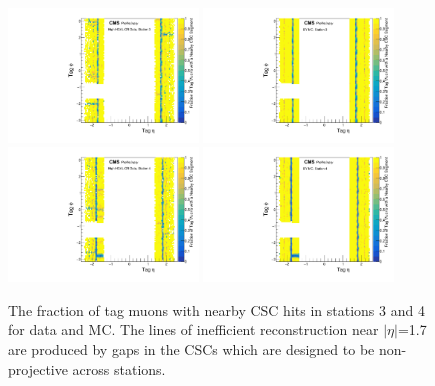 \begin{figure}[htbp]
    \includegraphics[width=0.45\textwidth]{figures/cscNearbyFracData_station2.pdf}
    \hspace{0.01\textwidth}
    \centering
    \includegraphics[width=0.45\textwidth]{figures/cscNearbyFracMC_station2.pdf}
    \includegraphics[width=0.45\textwidth]{figures/cscNearbyFracData_station3.pdf}
    \hspace{0.01\textwidth}
    \includegraphics[width=0.45\textwidth]{figures/cscNearbyFracMC_station3.pdf}
    \caption[CSC segment efficiencies for stations 3 and 4]{The fraction of tag muons with nearby CSC hits in stations 3 and 4 for data and MC. The lines of inefficient reconstruction near $|\eta|$=1.7 are produced by gaps in the CSCs which are designed to be non-projective across stations.}
    \label{fig:CSCeff2}
\end{figure}

